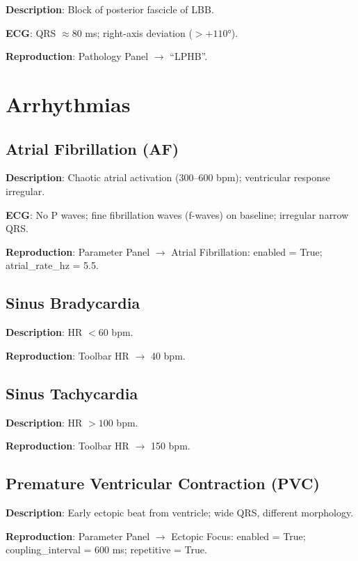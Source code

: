 \documentclass[12pt]{book}
\begin{document}
\textbf{Description}: Block of posterior fascicle of LBB.

\textbf{ECG}: QRS $\approx 80$ ms; right-axis deviation ($>+110°$).

\textbf{Reproduction}: Pathology Panel $\to$ ``LPHB''.

\section{Arrhythmias}

\subsection{Atrial Fibrillation (AF)}

\textbf{Description}: Chaotic atrial activation (300--600 bpm); ventricular response irregular.

\textbf{ECG}: No P waves; fine fibrillation waves (f-waves) on baseline; irregular narrow QRS.

\textbf{Reproduction}: Parameter Panel $\to$ Atrial Fibrillation: enabled = True; atrial\_rate\_hz = 5.5.

\subsection{Sinus Bradycardia}

\textbf{Description}: HR $<60$ bpm.

\textbf{Reproduction}: Toolbar HR $\to$ 40 bpm.

\subsection{Sinus Tachycardia}

\textbf{Description}: HR $>100$ bpm.

\textbf{Reproduction}: Toolbar HR $\to$ 150 bpm.

\subsection{Premature Ventricular Contraction (PVC)}

\textbf{Description}: Early ectopic beat from ventricle; wide QRS, different morphology.

\textbf{Reproduction}: Parameter Panel $\to$ Ectopic Focus: enabled = True; coupling\_interval = 600 ms; repetitive = True.

\end{document}
